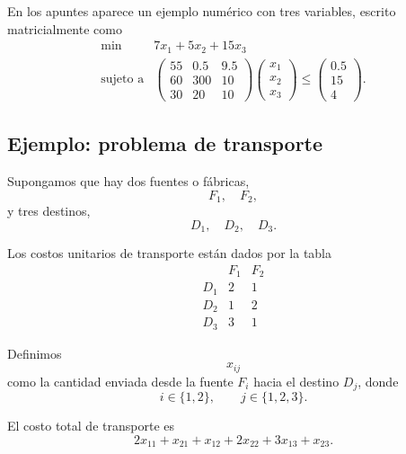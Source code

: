 En los apuntes aparece un ejemplo numérico con tres variables, escrito matricialmente como
\[
    \begin{array}{ll}
        \min & 7x_1+5x_2+15x_3\\[1mm]
        \text{sujeto a}
        &
        \begin{pmatrix}
            55 & 0.5 & 9.5\\
            60 & 300 & 10\\
            30 & 20 & 10
        \end{pmatrix}
        \begin{pmatrix}
            x_1\\
            x_2\\
            x_3
        \end{pmatrix}
        \leq
        \begin{pmatrix}
            0.5\\
            15\\
            4
        \end{pmatrix}.
    \end{array}
\]

\subsection{Ejemplo: problema de transporte}

Supongamos que hay dos fuentes o fábricas,
\[
    F_1,\quad F_2,
\]
y tres destinos,
\[
    D_1,\quad D_2,\quad D_3.
\]

Los costos unitarios de transporte están dados por la tabla
\[
\begin{array}{c|cc}
    & F_1 & F_2\\
    \hline
    D_1 & 2 & 1\\
    D_2 & 1 & 2\\
    D_3 & 3 & 1
\end{array}
\]

Definimos
\[
    x_{ij}
\]
como la cantidad enviada desde la fuente \(F_i\) hacia el destino \(D_j\), donde
\[
    i\in\{1,2\},
    \qquad
    j\in\{1,2,3\}.
\]

El costo total de transporte es
\[
    2x_{11}+x_{21}
    +
    x_{12}+2x_{22}
    +
    3x_{13}+x_{23}.
\]

